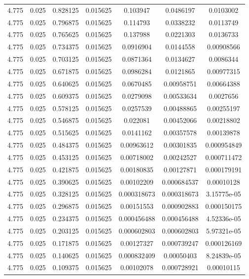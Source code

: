 \begin{flushleft}
\begin{longtable}{ccccccc}
4.775 & 0.025 & 0.828125 & 0.015625 & 0.103947 & 0.0486197 & 0.0103002  \\ 
4.775 & 0.025 & 0.796875 & 0.015625 & 0.114793 & 0.0338232 & 0.0113749  \\ 
4.775 & 0.025 & 0.765625 & 0.015625 & 0.137988 & 0.0221303 & 0.0136733  \\ 
4.775 & 0.025 & 0.734375 & 0.015625 & 0.0916904 & 0.0144558 & 0.00908566  \\ 
4.775 & 0.025 & 0.703125 & 0.015625 & 0.0871364 & 0.0134627 & 0.0086344  \\ 
4.775 & 0.025 & 0.671875 & 0.015625 & 0.0986284 & 0.0121865 & 0.00977315  \\ 
4.775 & 0.025 & 0.640625 & 0.015625 & 0.0670485 & 0.00958751 & 0.00664388  \\ 
4.775 & 0.025 & 0.609375 & 0.015625 & 0.0279098 & 0.00533634 & 0.0027656  \\ 
4.775 & 0.025 & 0.578125 & 0.015625 & 0.0257539 & 0.00488865 & 0.00255197  \\ 
4.775 & 0.025 & 0.546875 & 0.015625 & 0.022081 & 0.00452066 & 0.00218802  \\ 
4.775 & 0.025 & 0.515625 & 0.015625 & 0.0141162 & 0.00357578 & 0.00139878  \\ 
4.775 & 0.025 & 0.484375 & 0.015625 & 0.00963612 & 0.00301835 & 0.000954849  \\ 
4.775 & 0.025 & 0.453125 & 0.015625 & 0.00718002 & 0.00242527 & 0.000711472  \\ 
4.775 & 0.025 & 0.421875 & 0.015625 & 0.00180835 & 0.00127871 & 0.000179191  \\ 
4.775 & 0.025 & 0.390625 & 0.015625 & 0.00102209 & 0.000684537 & 0.00010128  \\ 
4.775 & 0.025 & 0.328125 & 0.015625 & 0.000318673 & 0.000318673 & 3.15775e-05  \\ 
4.775 & 0.025 & 0.296875 & 0.015625 & 0.00151553 & 0.000902883 & 0.000150175  \\ 
4.775 & 0.025 & 0.234375 & 0.015625 & 0.000456488 & 0.000456488 & 4.52336e-05  \\ 
4.775 & 0.025 & 0.203125 & 0.015625 & 0.000602803 & 0.000602803 & 5.97321e-05  \\ 
4.775 & 0.025 & 0.171875 & 0.015625 & 0.00127327 & 0.000739247 & 0.000126169  \\ 
4.775 & 0.025 & 0.140625 & 0.015625 & 0.000832409 & 0.00050403 & 8.24839e-05  \\ 
4.775 & 0.025 & 0.109375 & 0.015625 & 0.00102078 & 0.000728921 & 0.00010115  \\ 

\end{longtable}
\end{flushleft}
